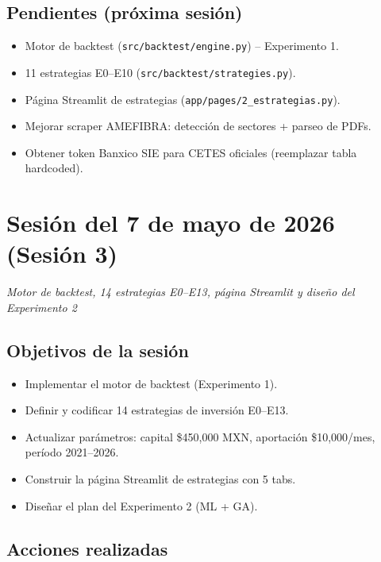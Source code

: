 \documentclass[12pt, a4paper]{article}
\newcommand{\sesion}[2]{%
  \section{Sesi\'{o}n del #1}%
  \textit{#2}%
  \vspace{0.5em}%
}
\begin{document}
\subsection{Pendientes (pr\'{o}xima sesi\'{o}n)}
\begin{itemize}
  \item[$\square$] Motor de backtest (\texttt{src/backtest/engine.py}) -- Experimento 1.
  \item[$\square$] 11 estrategias E0--E10 (\texttt{src/backtest/strategies.py}).
  \item[$\square$] P\'{a}gina Streamlit de estrategias (\texttt{app/pages/2\_estrategias.py}).
  \item[$\square$] Mejorar scraper AMEFIBRA: detecci\'{o}n de sectores + parseo de PDFs.
  \item[$\square$] Obtener token Banxico SIE para CETES oficiales (reemplazar tabla hardcoded).
\end{itemize}

\newpage
\sesion{7 de mayo de 2026 (Sesi\'{o}n 3)}{Motor de backtest, 14 estrategias E0--E13, p\'{a}gina Streamlit y dise\~{n}o del Experimento 2}

\subsection{Objetivos de la sesi\'{o}n}
\begin{itemize}
  \item Implementar el motor de backtest (Experimento 1).
  \item Definir y codificar 14 estrategias de inversi\'{o}n E0--E13.
  \item Actualizar par\'{a}metros: capital \$450{,}000 MXN, aportaci\'{o}n \$10{,}000/mes, per\'{i}odo 2021--2026.
  \item Construir la p\'{a}gina Streamlit de estrategias con 5 tabs.
  \item Dise\~{n}ar el plan del Experimento 2 (ML + GA).
\end{itemize}

\subsection{Acciones realizadas}
\end{document}
